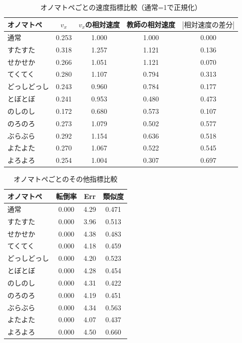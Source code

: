 \begin{table}[t]
  \centering
  \caption{オノマトペごとの速度指標比較（通常=1で正規化）}
  \label{tab:onomatope_metrics}
  \small
  \setlength{\tabcolsep}{4pt}
  \begin{tabular}{lcccc}
    \hline
    オノマトペ & $v_x$ & $v_x$の相対速度 & 教師の相対速度 & $|相対速度の差分|$ \\
    \hline
    通常         & 0.253 & 1.000 & 1.000 & 0.000 \\
    すたすた     & 0.318 & 1.257 & 1.121 & 0.136 \\
    せかせか     & 0.266 & 1.051 & 1.121 & 0.070 \\
    てくてく     & 0.280 & 1.107 & 0.794 & 0.313 \\
    どっしどっし & 0.243 & 0.960 & 0.784 & 0.177 \\
    とぼとぼ     & 0.241 & 0.953 & 0.480 & 0.473 \\
    のしのし     & 0.172 & 0.680 & 0.573 & 0.107 \\
    のろのろ     & 0.273 & 1.079 & 0.502 & 0.577 \\
    ぶらぶら     & 0.292 & 1.154 & 0.636 & 0.518 \\
    よたよた     & 0.270 & 1.067 & 0.522 & 0.545 \\
    よろよろ     & 0.254 & 1.004 & 0.307 & 0.697 \\
    \hline
  \end{tabular}
\end{table}

\begin{table}[t]
  \centering
  \caption{オノマトペごとのその他指標比較}
  \label{tab:onomatope_other_metrics}
  \small
  \setlength{\tabcolsep}{4pt}
  \begin{tabular}{lccc}
    \hline
    オノマトペ & 転倒率 & Err & 類似度 \\
    \hline
    通常         & 0.000 & 4.29 & 0.471 \\
    すたすた     & 0.000 & 3.96 & 0.513 \\
    せかせか     & 0.000 & 4.38 & 0.483 \\
    てくてく     & 0.000 & 4.18 & 0.459 \\
    どっしどっし & 0.000 & 4.20 & 0.523 \\
    とぼとぼ     & 0.000 & 4.28 & 0.454 \\
    のしのし     & 0.000 & 4.31 & 0.422 \\
    のろのろ     & 0.000 & 4.19 & 0.451 \\
    ぶらぶら     & 0.000 & 4.34 & 0.563 \\
    よたよた     & 0.000 & 4.07 & 0.437 \\
    よろよろ     & 0.000 & 4.50 & 0.660 \\
    \hline
  \end{tabular}
\end{table}

